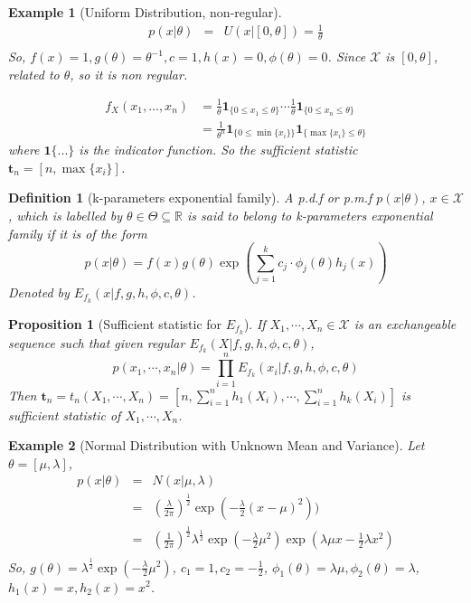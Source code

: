 \documentclass[11pt]{article}
\def\t{{\bm t}}
\newtheorem{definition}{Definition}[section]
\newtheorem{proposition}{Proposition}[section]
\newtheorem{example}{Example}[section]
\begin{document}
\begin{example}[Uniform Distribution, non-regular]
\begin{eqnarray*}
p(x|\theta) &=& U(x|[0,\theta])=\frac{1}{\theta} \\
\end{eqnarray*}
So, $f(x) = 1, g(\theta) = \theta^{-1}, c=1, h(x) = 0, \phi(\theta) = 0$.
Since $\mathcal{X}$ is $[0,\theta]$, related to $\theta$, so it is non regular.

    \begin{align*} f_X(x_1,\ldots,x_n) &= \frac{1}{\theta}\mathbf{1}_{\{0\leq x_1\leq\theta\}} \cdots \frac{1}{\theta}\mathbf{1}_{\{0\leq x_n\leq\theta\}} \\ &= \frac{1}{\theta^n}\mathbf{1}_{\{0\leq\min\{x_i\}\}}\mathbf{1}_{\{\max\{x_i\}\leq\theta\}} \end{align*} 
    where $\mathbf{1}\{...\}$ is the indicator function. So the sufficient statistic $\t_n = [n, \max\{x_i\}]$.
\end{example}
\begin{definition}[k-parameters exponential family]
A p.d.f or p.m.f $p(x|\theta)$, $x\in\mathcal{X}$, which is labelled by $\theta\in\Theta\subseteq\mathbb{R}$ is said to belong to k-parameters exponential family if it is of the form
$$
p(x|\theta) = f(x) g(\theta)\exp \left (\sum_{j=1}^{k}c_j\cdot\phi_j(\theta)h_j(x)\right ) 
$$
Denoted by $E_{f_k}(x|f,g,h,\phi, c,\theta)$.
\end{definition}
\begin{proposition}[Sufficient statistic for $E_{f_k}$] If $X_1, \cdots, X_n \in \mathcal{X}$ is an exchangeable sequence such that given regular $E_{f_k}(X|f,g,h,\phi,c,\theta)$, 
$$
p(x_1,\cdots,x_n|\theta) = \prod_{i=1}^{n}E_{f_k}(x_i|f,g,h,\phi,c,\theta)
$$
Then $\t_n=t_n(X_1,\cdots,X_n)=[n, \sum_{i=1}^{n}h_1(X_i), \cdots, \sum_{i=1}^{n}h_k(X_i)]$ is sufficient statistic of $X_1, \cdots, X_n$.
\end{proposition}
\begin{example}[Normal Distribution with Unknown Mean and Variance]
Let $\theta=[\mu,\lambda]$,
\begin{eqnarray*}
p(x|\theta) &=& N(x|\mu,\lambda) \\
&=& (\frac{\lambda}{2\pi})^{\frac{1}{2}}\exp(-\frac{\lambda}{2}(x-\mu)^2)) \\
&=& (\frac{1}{2\pi})^{\frac{1}{2}}\lambda^{\frac{1}{2}}\exp(-\frac{\lambda}{2}\mu^2)\exp(\lambda\mu x-\frac{1}{2}\lambda x^2) \\
\end{eqnarray*}
So, $g(\theta) =\lambda^{\frac{1}{2}}\exp(-\frac{\lambda}{2}\mu^2)$, $c_1=1, c_2=-\frac{1}{2}$, $\phi_1(\theta) = \lambda\mu, \phi_2(\theta) = \lambda$, $h_1(x)=x, h_2(x) = x^2$.
\end{example}
\end{document}
